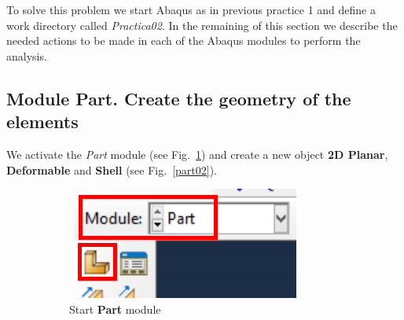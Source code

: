 To solve this problem we start Abaqus as in previous practice 1 and
define a work directory called \textit{Practica02}. In the remaining
of this section we describe the needed actions to be made in each of
the Abaqus modules to perform the analysis.

\subsection{Module Part. Create the geometry of the elements}
We activate the \textit{Part} module (see Fig.~\ref{part01}) and
create a new object \textbf{2D Planar}, \textbf{Deformable} and
\textbf{Shell} (see Fig.~\ref{part02}).
\begin{figure}[!h]
  \centering
  \begin{subfigure}[!h]{0.29\textwidth}
    \includegraphics[width=\textwidth]{./body/images/part01.pdf}
    \caption{Start \textbf{Part} module}
    \label{part01}
  \end{subfigure}%
  ~ %
  \begin{subfigure}[!h]{0.39\textwidth}

\end{subfigure}
\end{figure}
